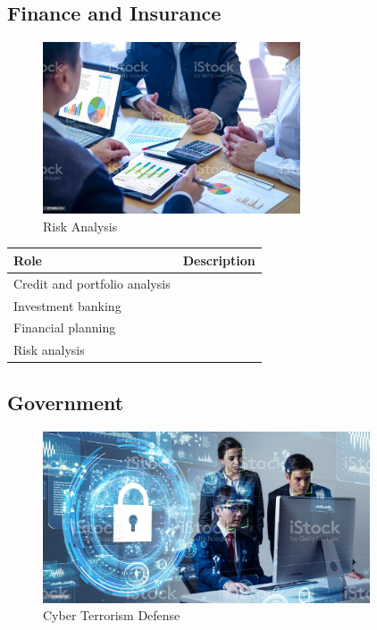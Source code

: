 \subsection{Finance and Insurance}

\begin{figure}[H]
	\begin{center}
		\caption{Risk Analysis}
		\vskip 4pt
		\includegraphics[height=2in]{images/careers/istockphoto-1210565724-1024x1024.jpg}
	\end{center}
\end{figure}

\begin{table}[H]
	\begin{center}
		\begin{tabular}{p{1.3in}|p{3in}} 
			\textbf{Role} & \textbf{Description}\\
			\hline
			Credit and portfolio analysis & \\
			\hline
			Investment banking & \\
			\hline
			Financial planning & \\
			\hline
			Risk analysis & \\
		\end{tabular}
	\end{center}
\end{table}

\subsection{Government}

\begin{figure}[H]
	\begin{center}
		\caption{Cyber Terrorism Defense}
		\vskip 4pt
		\includegraphics[height=2in]{images/careers/istockphoto-1169668290-1024x1024.jpg}
	\end{center}
\end{figure}

